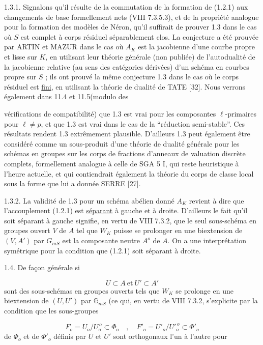 1.3.1. Signalons qu'il résulte de la commutation de la formation de (1.2.1) aux changements de base formellement nets (VIII 7.3.5.3), et de la propriété analogue pour la formation des modèles de Néron, qu'il suffirait de prouver 1.3 dans le cas où $S$ est complet à corps résiduel séparablement clos. La conjecture a été prouvée par ARTIN et MAZUR dans le cas où $A_K$ est la jacobienne d'une courbe propre et lisse sur $K$, en utilisant leur théorie générale (non publiée) de l'autodualité de la jacobienne relative (au sens des catégories dérivées) d'un schéma en courbes propre sur $S$ ; ils ont prouvé la même conjecture 1.3 dans le cas où le corps résiduel est \underline{fini}, en utilisant la théorie de dualité de TATE [32]. Nous verrons également dans 11.4 et 11.5(modulo des



vérifications de compatibilité) que 1.3 est vrai pour les composantes $\ell$-primaires pour $\ell \neq p$, et que 1.3 est vrai dans le cas de la ``réduction semi-stable''. Ces résultats rendent 1.3 extrêmement plausible. D'ailleurs 1.3 peut également être considéré comme un sous-produit d'une théorie de dualité générale pour les schémas en groupes sur les corps de fractions d'anneaux de valuation discrète complets, formellement analogue à celle de SGA 5 I, qui reste heuristique à l'heure actuelle, et qui contiendrait également la théorie du corps de classe local sous la forme que lui a donnée SERRE [27].

1.3.2. La validité de 1.3 pour un schéma abélien donné $A_K$ revient à dire que l'accouplement (1.2.1) est \underline{séparant} à gauche et à droite. D'ailleurs le fait qu'il soit séparant à gauche signifie, en vertu de VIII 7.3.2, que le seul sous-schéma en groupes ouvert $V$ de $A$ tel que $W_K$ puisse se prolonger en une biextension de $(V,A')$ par $G_{mS}$ est la composante neutre $A^o$ de $A$. On a une interprétation symétrique pour la condition que (1.2.1) soit séparant à droite.

1.4. De façon générale si

\begin{equation}\tag{1.4.1}
U \subset A \ \mbox{et} \ U' \subset A'
\end{equation}
sont des sous-schémas en groupes ouverts tels que $W_K$ se prolonge en une biextension de $(U,U')$ par $\mathbb{G}_{mS}$ (ce qui, en vertu de VIII 7.3.2, s'explicite par la condition que les sous-groupes

\begin{equation}\tag{1.4.2}
F_o = U_o/U_o^{\,o} \subset \Phi_o \quad , \quad F'_o = {U'}_o/{U'}_o^{\,o} \subset \Phi'_o
\end{equation}
de $\Phi_o$ et de $\Phi'_o$ définis par $U$ et $U'$ sont orthogonaux l'un à l'autre pour


